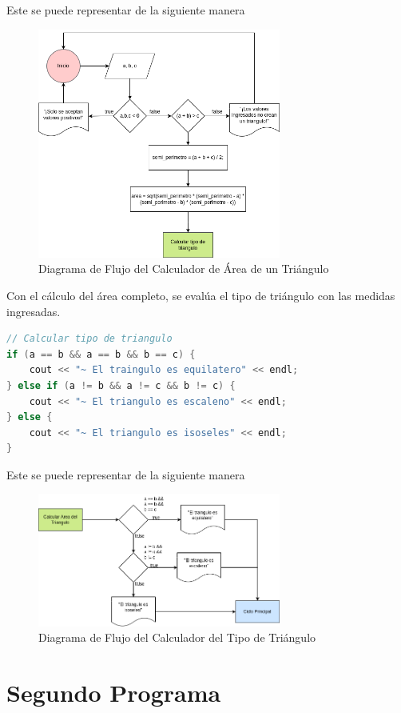 \documentclass{article}
\begin{document}
Este se puede representar de la siguiente manera

\begin{figure}[H]
    \centering
    \includegraphics[width=8cm]{triangulo_area}
    \caption{Diagrama de Flujo del Calculador de Área de un Triángulo}
\end{figure}

Con el cálculo del área completo, se evalúa el tipo de triángulo con las medidas ingresadas.


\begin{lstlisting}[style=mystyle, language=c++]
// Calcular tipo de triangulo
if (a == b && a == b && b == c) {
    cout << "~ El traingulo es equilatero" << endl;
} else if (a != b && a != c && b != c) {
    cout << "~ El triangulo es escaleno" << endl;
} else {
    cout << "~ El triangulo es isoseles" << endl;
}
\end{lstlisting}

Este se puede representar de la siguiente manera

\begin{figure}[H]
    \centering
    \includegraphics[width=8cm]{triangulo_tipo}
    \caption{Diagrama de Flujo del Calculador del Tipo de Triángulo}
\end{figure}

\section{Segundo Programa}
\end{document}
